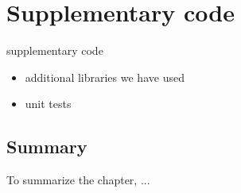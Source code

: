 \chapter{Supplementary code}
\label{chapter:supplementarycode}
supplementary code
\begin{itemize}
\item additional libraries we have used
\item unit tests
\end{itemize}

\section*{Summary}
To summarize the chapter, ...